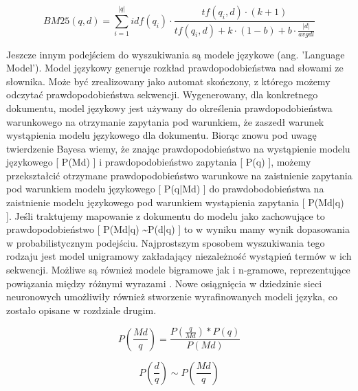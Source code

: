 \begin{equation}
	BM25(q, d) = \sum_{i=1}^{|q|} idf(q_i) \cdot \frac{tf(q_i, d) \cdot (k + 1)}{tf(q_i, d) + k \cdot (1 - b) + b \cdot \frac{|d|}{avgdl}}
\end{equation}\newline

Jeszcze innym podejściem do wyszukiwania są modele językowe (ang. 'Language Model').
Model językowy generuje rozkład prawdopodobieństwa nad słowami ze słownika. Może być
zrealizowany jako automat skończony, z którego możemy odczytać prawdopodobieństwa sekwencji.
Wygenerowany, dla konkretnego dokumentu, model językowy jest używany do określenia
prawdopodobieństwa warunkowego na otrzymanie zapytania pod warunkiem, że zaszedł warunek
wystąpienia modelu językowego dla dokumentu. Biorąc znowu pod uwagę twierdzenie Bayesa wiemy,
że znając prawdopodobieństwo na wystąpienie modelu językowego [ P(Md) ] i prawdopodobieństwo zapytania [ P(q) ], możemy przekształcić otrzymane prawdopodobieństwo warunkowe na zaistnienie zapytania pod warunkiem modelu językowego [ P(q|Md) ] do prawdobodobieństwa na zaistnienie modelu językowego pod warunkiem wystąpienia zapytania [ P(Md|q) ]. Jeśli traktujemy mapowanie z dokumentu do modelu jako zachowujące to
prawdopodobieństwo [ P(Md|q) \textasciitilde P(d|q) ] to w wyniku mamy wynik dopasowania w probabilistycznym
podejściu. Najprostszym sposobem wyszukiwania tego rodzaju jest model unigramowy zakładający niezależność
wystąpień termów w ich sekwencji. Możliwe są również modele bigramowe jak i n-gramowe,
reprezentujące powiązania między różnymi wyrazami \autocite{introtoinformationretrieval}. Nowe osiągnięcia w dziedzinie sieci
neuronowych umożliwiły również stworzenie wyrafinowanych modeli języka, co zostało opisane w rozdziale drugim.


\begin{equation}
P(\frac{Md}{q})=\frac{P(\frac{q}{Md})*P(q)}{P(Md)}
\end{equation}

\begin{equation}
P(\frac{d}{q}) \sim P(\frac{Md}{q})
\end{equation}\newline

